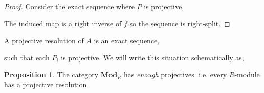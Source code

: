 \documentclass[12pt]{article}
\newcommand{\id}{\mathrm{id}}
\newcommand{\Mod}[1]{\mathbf{Mod}_{#1}}
\theoremstyle{remark}
\theoremstyle{definition}
\newtheorem{proposition}[theorem]{Proposition}
\newenvironment{definition}[1][Definition:]{\begin{trivlist}
\item[\hskip \labelsep {\bfseries #1}]}{\end{trivlist}}
\begin{document}
\begin{proof}
Consider the exact sequence where $P$ is projective,
\begin{center}
\end{center}
The induced map is a right inverse of $f$ so the sequence is right-split.
\end{proof}

\begin{definition}
A projective resolution of $A$ is an exact sequence,
\begin{center}
\end{center}
such that each $P_i$ is projective.
We will write this situation schematically as,
\begin{center}
\end{center} 
\end{definition}

\begin{proposition}
The category $\Mod{R}$ has \textit{enough} projectives. i.e. every $R$-module has a projective resolution
\end{proposition}
\end{document}
